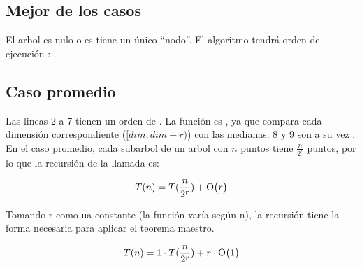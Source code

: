 \subsection{Mejor de los casos}
El arbol es nulo o es tiene un único ``nodo''.
El algoritmo tendrá orden de ejecución : .

\subsection{Caso promedio}
Las lineas 2 a 7 tienen un orden de . La función 
es , ya que compara cada dimensión correspondiente (\([dim, dim+r)\))
con las medianas. 8 y 9 son a su vez .
En el caso promedio, cada subarbol de un arbol con \(n\) puntos tiene
\(\frac{n}{2^r}\) puntos, por lo que la recursión de la llamada es:

\[ T(n) = T(\frac{n}{2^r}) + \mathrm{O}\bigl(r\bigr) \]

Tomando r como ua constante (la función varía según n), la recursión
tiene la forma necesaria para aplicar el teorema maestro.

\[ T(n) = 1 \cdot T(\frac{n}{2^r}) + r \cdot \mathrm{O}\bigl(1\bigr) \]



